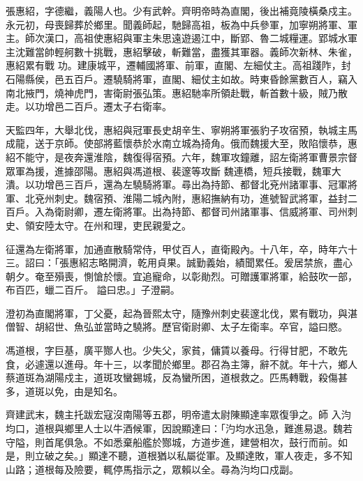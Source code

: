 
\begin{pinyinscope}

 張惠紹，字德繼，義陽人也。少有武幹。齊明帝時為直閣，後出補竟陵橫桑戍主。永元初，母喪歸葬於鄉里。聞義師起，馳歸高祖，板為中兵參軍，加寧朔將軍、軍主。師次漢口，高祖使惠紹與軍主朱思遠遊遏江中，斷郢、魯二城糧運。郢城水軍主沈難當帥輕舸數十挑戰，惠紹擊破，斬難當，盡獲其軍器。義師次新林、朱雀，惠紹累有戰
 功。建康城平，遷輔國將軍、前軍，直閣、左細仗主。高祖踐阼，封石陽縣侯，邑五百戶。遷驍騎將軍，直閣、細仗主如故。時東昏餘黨數百人，竊入南北掖門，燒神虎門，害衛尉張弘策。惠紹馳率所領赴戰，斬首數十級，賊乃散走。以功增邑二百戶。遷太子右衛率。



 天監四年，大舉北伐，惠紹與冠軍長史胡辛生、寧朔將軍張豹子攻宿預，執城主馬成龍，送于京師。使部將藍懷恭於水南立城為掎角。俄而魏援大至，敗陷懷恭，惠紹不能守，是夜奔還淮陰，魏復得宿預。六年，魏軍攻鐘離，詔左衛將軍曹景宗督眾軍為援，進據邵陽。惠紹與馮道根、裴邃等攻斷
 魏連橋，短兵接戰，魏軍大潰。以功增邑三百戶，還為左驍騎將軍。尋出為持節、都督北兗州諸軍事、冠軍將軍、北兗州刺史。魏宿預、淮陽二城內附，惠紹撫納有功，進號智武將軍，益封二百戶。入為衛尉卿，遷左衛將軍。出為持節、都督司州諸軍事、信威將軍、司州刺史、領安陸太守。在州和理，吏民親愛之。



 征還為左衛將軍，加通直散騎常侍，甲仗百人，直衛殿內。十八年，卒，時年六十三。詔曰：「張惠紹志略開濟，乾用貞果。誠勤義始，績聞累任。爰居禁旅，盡心朝夕。奄至殞喪，惻愴於懷。宜追寵命，以彰勛烈。可贈護軍將軍，給鼓吹一部，布百匹，蠟二百斤。
 謚曰忠。」子澄嗣。



 澄初為直閣將軍，丁父憂，起為晉熙太守，隨豫州刺史裴邃北伐，累有戰功，與湛僧智、胡紹世、魚弘並當時之驍將。歷官衛尉卿、太子左衛率。卒官，謚曰愍。



 馮道根，字巨基，廣平酂人也。少失父，家貧，傭賃以養母。行得甘肥，不敢先食，必遽還以進母。年十三，以孝聞於鄉里。郡召為主簿，辭不就。年十六，鄉人蔡道斑為湖陽戍主，道斑攻蠻錫城，反為蠻所困，道根救之。匹馬轉戰，殺傷甚多，道斑以免，由是知名。



 齊建武末，魏主托跋宏寇沒南陽等五郡，明帝遣太尉陳顯達率眾復爭之。師
 入汮均口，道根與鄉里人士以牛酒候軍，因說顯達曰：「汋均水迅急，難進易退。魏若守隘，則首尾俱急。不如悉棄船艦於酂城，方道步進，建營相次，鼓行而前。如是，則立破之矣。」顯達不聽，道根猶以私屬從軍。及顯達敗，軍人夜走，多不知山路；道根每及險要，輒停馬指示之，眾賴以全。尋為汮均口戍副。




\end{pinyinscope}
